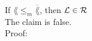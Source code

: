 If $\lang \leq_m \overline{\lang}$, then $\mathcal{L} \in \mathcal{R}$ \\

The claim is false. \\

Proof: \\
\TODO \\